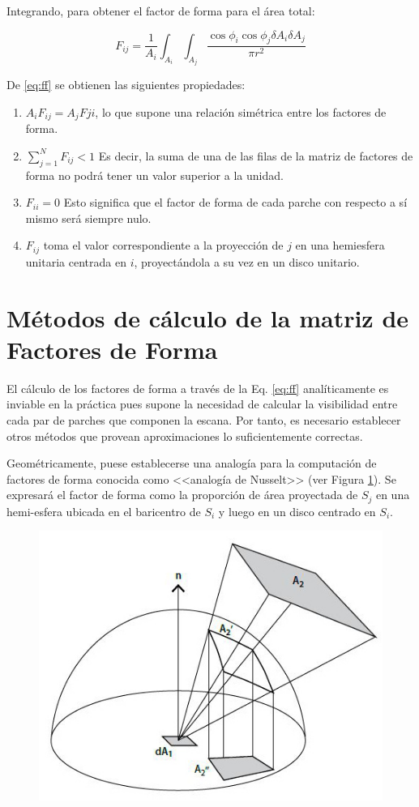 Integrando, para obtener el factor de forma para el área total:

\begin{equation}
    F_{ij} = \frac{1}{A_{i}} \int_{A_{i}}\int_{A_{j}}\frac{\cos{\phi_{i}}\cos{\phi_{j}}\delta{A_{i}}\delta{A_{j}}}{\pi{r^{2}}} \label{eq:ff}    
\end{equation}

De \eqref{eq:ff} se obtienen las siguientes propiedades:
\begin{enumerate}
	\label{propsff}
    \item $A_{i}F_{ij} = A_{j}F{ji}$, lo que supone una relación simétrica entre los factores de forma.
    \item $\sum_{j=1}^{N} F_{ij} < 1$ Es decir, la suma de una de las filas de la matriz de factores de forma no podrá tener un valor superior a la unidad.
    \item $F_{ii} = 0$ Esto significa que el factor de forma de cada parche con respecto a sí mismo será siempre nulo.
    \item $F_{ij}$ toma el valor correspondiente a la proyección de $j$ en una hemiesfera unitaria centrada en $i$, proyectándola a su vez en un disco unitario.
\end{enumerate}


\section{Métodos de cálculo de la matriz de Factores de Forma}
\label{sec:calculoff}

El cálculo de los factores de forma a través de la Eq. \eqref{eq:ff} analíticamente es inviable en la práctica pues supone la necesidad de calcular la visibilidad entre cada par de parches que componen la escana. Por tanto, es necesario establecer otros métodos que provean aproximaciones lo suficientemente correctas.

Geométricamente, puese establecerse una analogía para la computación de factores de forma conocida como <<analogía de Nusselt>> (ver Figura \ref{img:nusselt}). Se expresará el factor de forma como la proporción de área proyectada de $S_{j}$ en una hemi-esfera ubicada en el baricentro de $S_{i}$ y luego en un disco centrado en $S_{i}$.

\begin{figure}[H]
	\centering
	\includegraphics[width=0.55\linewidth]{assets/nusselt}
	\label{img:nusselt}
\end{figure}

